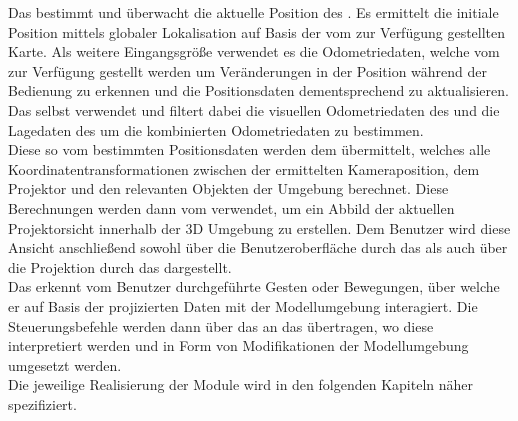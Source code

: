 Das \mLocalization bestimmt und überwacht die aktuelle Position des . Es ermittelt die initiale Position mittels globaler Lokalisation auf Basis der vom \mMapserver zur Verfügung gestellten Karte. Als weitere Eingangsgröße verwendet es die Odometriedaten, welche vom \mEkf zur Verfügung gestellt werden um Veränderungen in der Position während der Bedienung zu erkennen und die Positionsdaten dementsprechend zu aktualisieren. Das \mEkf selbst verwendet und filtert dabei die visuellen Odometriedaten des \mFovis und die Lagedaten des \mImu {} um die kombinierten Odometriedaten zu bestimmen.\\
Diese so vom \mLocalization bestimmten Positionsdaten werden dem \mTransformation übermittelt, welches alle Koordinatentransformationen zwischen der ermittelten Kameraposition, dem Projektor und den relevanten Objekten der Umgebung berechnet. Diese Berechnungen werden dann vom \mVisualization verwendet, um ein Abbild der aktuellen Projektorsicht innerhalb der 3D Umgebung zu erstellen. Dem Benutzer wird diese Ansicht anschließend sowohl über die Benutzeroberfläche durch das \mGui als auch über die Projektion durch das \mProjection dargestellt. \\
Das \mInteraction erkennt vom Benutzer durchgeführte Gesten oder Bewegungen, über welche er auf Basis der projizierten Daten mit der Modellumgebung interagiert. Die Steuerungsbefehle werden dann über das \mTransformation an das \mVisualization übertragen, wo diese interpretiert werden und in Form von Modifikationen der Modellumgebung umgesetzt werden.\\
Die jeweilige Realisierung der Module wird in den folgenden Kapiteln näher spezifiziert.\\

